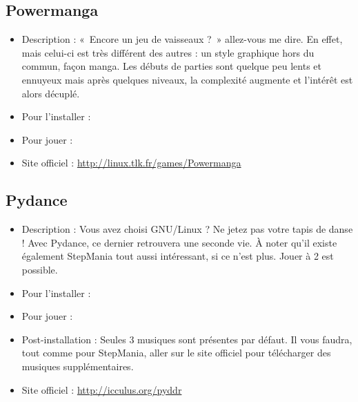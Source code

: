 \subsection{Powermanga}
\begin{itemize}
\begingroup
{}
\item Description : «~Encore un jeu de vaisseaux ?~» allez-vous me dire. En effet, mais celui-ci est très différent des autres : un style graphique hors du commun, façon manga. Les débuts de parties sont quelque peu lents et ennuyeux mais après quelques niveaux, la complexité augmente et l'intérêt est alors décuplé.{\par}
\endgroup
\item Pour l'installer : 
\item Pour jouer : 
\item Site officiel : \url{http://linux.tlk.fr/games/Powermanga}{\par}
\end{itemize}
\subsection{Pydance}
\begin{itemize}
\begingroup
{}
\item Description : Vous avez choisi GNU/Linux ? Ne jetez pas votre tapis de danse ! Avec Pydance, ce dernier retrouvera une seconde vie. À noter qu'il existe également StepMania tout aussi intéressant, si ce n'est plus. Jouer à 2 est possible.{\par}
\endgroup
\item Pour l'installer : 
\item Pour jouer : 
\item Post-installation : Seules 3 musiques sont présentes par défaut. Il vous faudra, tout comme pour StepMania, aller sur le site officiel pour télécharger des musiques  supplémentaires.{\par}
\item Site officiel : \url{http://icculus.org/pyddr}{\par}
\end{itemize}
